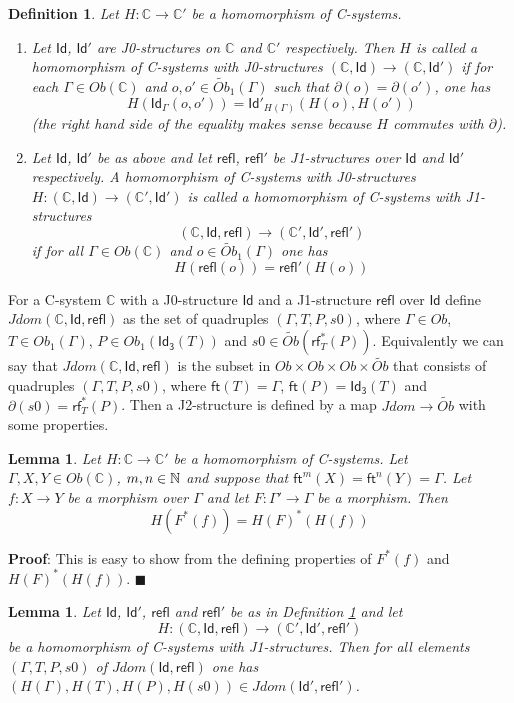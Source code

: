 \documentclass[12pt]{article}
\numberwithin{equation}{section}
\newenvironment{myproof}{{\bf Proof}:}{$\blacksquare$ \vskip 5mm }
\newtheorem{lemma}[proposition]{Lemma}
\newtheorem{definition}[proposition]{Definition}
\newcommand{\llabel}[1]{\label{#1}}
\newcommand{\sr}{\rightarrow}
\newcommand{\nn}{{\mathbb N\rm}}
\newcommand{\wt}{\widetilde}
\newcommand{\CC}{{\mathbb C}}  %
\newcommand{\ft}{\mathsf{ft}}
\newcommand{\Id}{\mathsf{Id}} %
\newcommand{\Idx}{\mathsf{Id_3}} %
\newcommand{\refl}{\mathsf{refl}}
\newcommand{\rf}{\mathsf{rf}}
\newcommand{\Obwt}{\wt{Ob}}
\begin{document}
%
\begin{definition}
\llabel{2015.04.06.def1} Let $H:\CC\sr \CC'$ be a homomorphism of C-systems.
%
\begin{enumerate}
\item Let $\Id$, $\Id'$ are J0-structures on $\CC$ and $\CC'$ respectively.  Then
  $H$ is called a homomorphism of C-systems with J0-structures $(\CC,\Id)\sr
  (\CC,\Id')$ if for each $\Gamma\in Ob(\CC)$ and $o,o'\in\Obwt_1(\Gamma)$ such
  that $\partial(o)=\partial(o')$, one has
%
$$H(\Id_{\Gamma}(o,o'))=\Id'_{H(\Gamma)}(H(o),H(o'))$$
%
(the right hand side of the equality makes sense because $H$ commutes with
  $\partial$).
% 
\item Let $\Id$, $\Id'$ be as above and let $\refl$, $\refl'$ be J1-structures
  over $\Id$ and $\Id'$ respectively. A homomorphism of C-systems with
  J0-structures $H:(\CC,\Id)\sr (\CC',\Id')$ is called a homomorphism of
  C-systems with J1-structures
%
$$(\CC,\Id,\refl)\sr (\CC',\Id',\refl')$$
%
if for all $\Gamma\in Ob(\CC)$ and $o\in \Obwt_1(\Gamma)$ one has
%
$$H(\refl(o))=\refl'(H(o))$$
%
\end{enumerate}
\end{definition}
%
For a C-system $\CC$ with a J0-structure $\Id$ and a J1-structure $\refl$ over
$\Id$ define $Jdom(\CC,\Id,\refl)$ as the set of quadruples $(\Gamma,T,P,s0)$,
where $\Gamma\in Ob$, $T\in Ob_1(\Gamma)$, $P\in Ob_1(\Idx(T))$ and $s0\in
\Obwt(\rf_T^*(P))$. Equivalently we can say that $Jdom(\CC,\Id,\refl)$ is the
subset in $Ob\times Ob\times Ob\times \Obwt$ that consists of quadruples
$(\Gamma,T,P,s0)$, where $\ft(T)=\Gamma$, $\ft(P)=\Idx(T)$ and
$\partial(s0)=\rf_T^*(P)$. Then a J2-structure is defined by a map $Jdom\sr
\Obwt$ with some properties.
%
\begin{lemma}
\llabel{2015.04.06.l3} Let $H:\CC\sr \CC'$ be a homomorphism of C-systems. Let
$\Gamma,X,Y\in Ob(\CC)$, $m,n\in\nn$ and suppose that
$\ft^m(X)=\ft^{n}(Y)=\Gamma$. Let $f:X\sr Y$ be a morphism over $\Gamma$ and let
$F:\Gamma'\sr \Gamma$ be a morphism. Then
%
$$H(F^*(f))=H(F)^*(H(f))$$
%
\end{lemma}
%
\begin{myproof}
This is easy to show from the defining properties of $F^*(f)$ and
$H(F)^*(H(f))$.
\end{myproof}
%
%
\begin{lemma}
\llabel{2015.04.06.l2} Let $\Id$, $\Id'$, $\refl$ and $\refl'$ be as in
Definition \ref{2015.04.06.def1} and let
%
$$H:(\CC,\Id,\refl)\sr (\CC',\Id',\refl')$$
%
be a homomorphism of C-systems with J1-structures. Then for all elements
$(\Gamma,T,P,s0)$ of $Jdom(\Id,\refl)$ one has $(H(\Gamma),H(T),H(P),H(s0))\in
Jdom(\Id',\refl')$.
\end{lemma}
\end{document}
